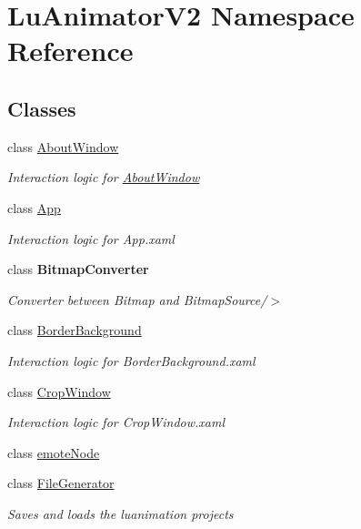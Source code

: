 \hypertarget{namespace_lu_animator_v2}{}\section{Lu\+Animator\+V2 Namespace Reference}
\label{namespace_lu_animator_v2}
\subsection*{Classes}
\begin{DoxyCompactItemize}
\item 
class \hyperlink{class_lu_animator_v2_1_1_about_window}{About\+Window}
\begin{DoxyCompactList}\small\item\em Interaction logic for \hyperlink{class_lu_animator_v2_1_1_about_window}{About\+Window} \end{DoxyCompactList}\item 
class \hyperlink{class_lu_animator_v2_1_1_app}{App}
\begin{DoxyCompactList}\small\item\em Interaction logic for App.\+xaml \end{DoxyCompactList}\item 
class {\bfseries Bitmap\+Converter}
\begin{DoxyCompactList}\small\item\em Converter between Bitmap and Bitmap\+Source/$>$ \end{DoxyCompactList}\item 
class \hyperlink{class_lu_animator_v2_1_1_border_background}{Border\+Background}
\begin{DoxyCompactList}\small\item\em Interaction logic for Border\+Background.\+xaml \end{DoxyCompactList}\item 
class \hyperlink{class_lu_animator_v2_1_1_crop_window}{Crop\+Window}
\begin{DoxyCompactList}\small\item\em Interaction logic for Crop\+Window.\+xaml \end{DoxyCompactList}\item 
class \hyperlink{class_lu_animator_v2_1_1emote_node}{emote\+Node}
\item 
class \hyperlink{class_lu_animator_v2_1_1_file_generator}{File\+Generator}
\begin{DoxyCompactList}\small\item\em Saves and loads the luanimation projects \end{DoxyCompactList}\item 

\end{DoxyCompactItemize}
